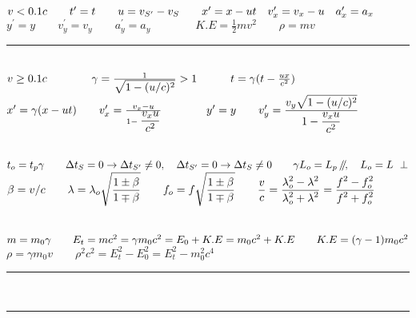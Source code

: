 \documentclass[a4paper,12pt]{article}
\newcommand{\slparallel}{\mathbin{\!/\mkern-5mu/\!}}
\begin{document}

\fontsize{14.5}{16}\selectfont

\noindent
$v < 0.1c \qquad t^\prime = t \qquad u = v_{S^\prime} - v_S \qquad x^\prime = x - ut \quad v^\prime_x = v_x - u \quad a_x^\prime = a_x \\[+2mm]$
$ y^\prime = y \qquad v^\prime_y = v_y \qquad a_y^\prime = a_y \qquad \qquad K.E = \frac{1}{2} mv^2 \qquad \rho = mv $

{\centering \rule{10cm}{0.4pt} \par}

\ \\
\noindent
$ v \ge 0.1c \qquad \qquad \gamma = \frac{1}{\displaystyle \sqrt{1- (u/c)^2}} > 1 \qquad \quad t = \gamma (t - \frac{ux}{c^2})\\$
$x^\prime = \gamma(x - ut) \qquad v^\prime_x = \frac{v_x - u}{1- \displaystyle \frac{v_x u}{c^2} } \qquad \qquad  y^\prime = y \qquad v^\prime_y = \displaystyle \frac{\displaystyle v_y \sqrt{1-(u/c)^2}}{\displaystyle 1- \frac{v_x u}{c^2}}\\[-3mm]$

{\centering \hdashrule{10cm}{0.4pt}{4pt} \par}

\ \\
\noindent
$ t_o = t_p \gamma \qquad \Delta t_S = 0 \rightarrow \Delta t_{S^\prime} \neq 0, \quad \Delta t_{S^\prime} = 0 \rightarrow \Delta t_S \neq 0 \qquad \gamma L_o = L_p \ \slparallel, \quad L_o = L \ \perp \\[+2mm]$
$ \beta = v/c \qquad \lambda = \lambda_o \displaystyle \sqrt{\frac{1\pm \beta}{1\mp \beta}} \qquad f_o = f \displaystyle \sqrt{\frac{1\pm \beta}{1\mp \beta}} \qquad \frac{v}{c} = \frac{\displaystyle \lambda_o^2 - \lambda^2}{\displaystyle \lambda_o^2 + \lambda^2} = \frac{\displaystyle f^2 - f_o^2}{\displaystyle f^2 + f_o^2} \\[-1mm]$

{\centering \hdashrule{10cm}{0.4pt}{4pt} \par}

\ \\
\noindent
$ m = m_0 \gamma \qquad E_t = mc^2 = \gamma m_0c^2 = E_0 + K.E = m_0c^2 + K.E \qquad K.E = (\gamma - 1) m_0c^2 \\[+2mm]$
$\rho = \gamma m_0v \qquad \rho^2c^2 = E_t^2 - E_0^2 = E_t^2 - m_0^2c^4$

{\centering \rule{10cm}{0.8pt}\\\rule[\dimexpr \ht\strutbox+0.1cm]{7cm}{0.8pt} \par}
\end{document}
